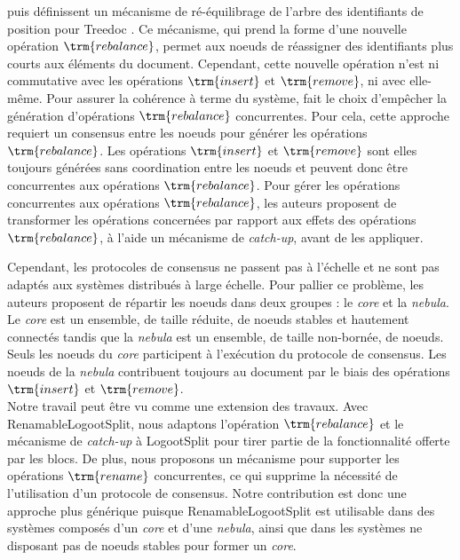 \cite{letia:hal-01248270} puis \cite{zawirski:hal-01248197} définissent un mécanisme de ré-équilibrage de l'arbre des identifiants de position pour Treedoc \cite{2009-treedoc-preguica}.
Ce mécanisme, qui prend la forme d'une nouvelle opération $\trm{rebalance}$, permet aux noeuds de réassigner des identifiants plus courts aux éléments du document.
Cependant, cette nouvelle opération n'est ni commutative avec les opérations $\trm{insert}$ et $\trm{remove}$, ni avec elle-même.
Pour assurer la cohérence à terme \cite{10.1145/224057.224070} du système, \cite{zawirski:hal-01248197} fait le choix d'empêcher la génération d'opérations $\trm{rebalance}$ concurrentes.
Pour cela, cette approche requiert un consensus entre les noeuds pour générer les opérations $\trm{rebalance}$.
Les opérations $\trm{insert}$ et $\trm{remove}$ sont elles toujours générées sans coordination entre les noeuds et peuvent donc être concurrentes aux opérations $\trm{rebalance}$.
Pour gérer les opérations concurrentes aux opérations $\trm{rebalance}$, les auteurs proposent de transformer les opérations concernées par rapport aux effets des opérations$\trm{rebalance}$, à l'aide un mécanisme de \emph{catch-up}, avant de les appliquer.

Cependant, les protocoles de consensus ne passent pas à l'échelle et ne sont pas adaptés aux systèmes distribués à large échelle.
Pour pallier ce problème, les auteurs proposent de répartir les noeuds dans deux groupes : le \emph{core} et la \emph{nebula}.
Le \emph{core} est un ensemble, de taille réduite, de noeuds stables et hautement connectés tandis que la \emph{nebula} est un ensemble, de taille non-bornée, de noeuds.
Seuls les noeuds du \emph{core} participent à l'exécution du protocole de consensus.
Les noeuds de la \emph{nebula} contribuent toujours au document par le biais des opérations $\trm{insert}$ et $\trm{remove}$.\\

Notre travail peut être vu comme une extension des travaux.
Avec RenamableLogootSplit, nous adaptons l'opération $\trm{rebalance}$ et le mécanisme de \emph{catch-up} à LogootSplit pour tirer partie de la fonctionnalité offerte par les blocs.
De plus, nous proposons un mécanisme pour supporter les opérations $\trm{rename}$ concurrentes, ce qui supprime la nécessité de l'utilisation d'un protocole de consensus.
Notre contribution est donc une approche plus générique puisque RenamableLogootSplit est utilisable dans des systèmes composés d'un \emph{core} et d'une \emph{nebula}, ainsi que dans les systèmes ne disposant pas de noeuds stables pour former un \emph{core}.


